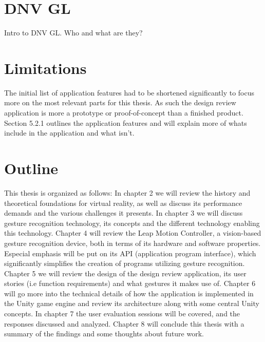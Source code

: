 

\section{DNV GL}
Intro to DNV GL. Who and what are they?

\section{Limitations}
The initial list of application features had to be shortened significantly to focus more on the most relevant parts for this thesis. As such the design review application
is more a prototype or proof-of-concept than a finished product. Section 5.2.1 outlines the application features and will explain more of whats include in the application and what isn't. 

\section{Outline}
This thesis is organized as follows: In chapter 2 we will review the history and theoretical foundations for virtual reality, as well as discuss its performance demands
and the various challenges it presents. In chapter 3 we will discuss gesture recognition technology, its concepts and the different technology enabling this technology.
Chapter 4 will review the Leap Motion Controller, a vision-based gesture recognition device, both in terms of its hardware and software properties. Especial
emphasis will be put on its API (application program interface), which significantly simplifies the creation of programs utilizing gesture recognition.
Chapter 5 we will review the design of the design review application, its user stories (i.e function requirements) and what gestures it makes use of.
Chapter 6 will go more into the technical details of how the application is implemented in the Unity game engine and review its architecture along with some central Unity concepts.
In chapter 7 the user evaluation sessions will be covered, and the responses discussed and analyzed.
Chapter 8 will conclude this thesis with a summary of the findings and some thoughts about future work.